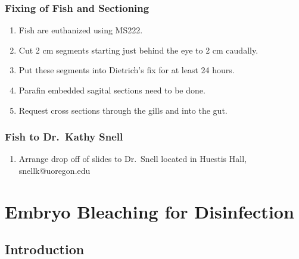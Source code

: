 \documentclass[
  letterpaper,
  DIV=11,
  numbers=noendperiod]{scrreprt}
\providecommand{\tightlist}{%
  \setlength{\itemsep}{0pt}\setlength{\parskip}{0pt}}\usepackage{longtable,booktabs,array}
\begin{document}
\hypertarget{fixing-of-fish-and-sectioning}{%
\subsection{Fixing of Fish and
Sectioning}\label{fixing-of-fish-and-sectioning}}

\begin{enumerate}
\def\labelenumi{\arabic{enumi}.}
\tightlist
\item
  Fish are euthanized using MS222.
\item
  Cut 2 cm segments starting just behind the eye to 2 cm caudally.
\item
  Put these segments into Dietrich's fix for at least 24 hours.
\item
  Parafin embedded sagital sections need to be done.
\item
  Request cross sections through the gills and into the gut.
\end{enumerate}

\hypertarget{fish-to-dr.-kathy-snell}{%
\subsection{Fish to Dr.~Kathy Snell}\label{fish-to-dr.-kathy-snell}}

\begin{enumerate}
\def\labelenumi{\arabic{enumi}.}
\tightlist
\item
  Arrange drop off of slides to Dr.~Snell located in Huestis Hall,
  snellk@uoregon.edu
\end{enumerate}

\hypertarget{sec-husbandry_stickleback_embryo_bleaching}{%
\chapter{Embryo Bleaching for
Disinfection}\label{sec-husbandry_stickleback_embryo_bleaching}}

\hypertarget{introduction-54}{%
\section{Introduction}\label{introduction-54}}
\end{document}
